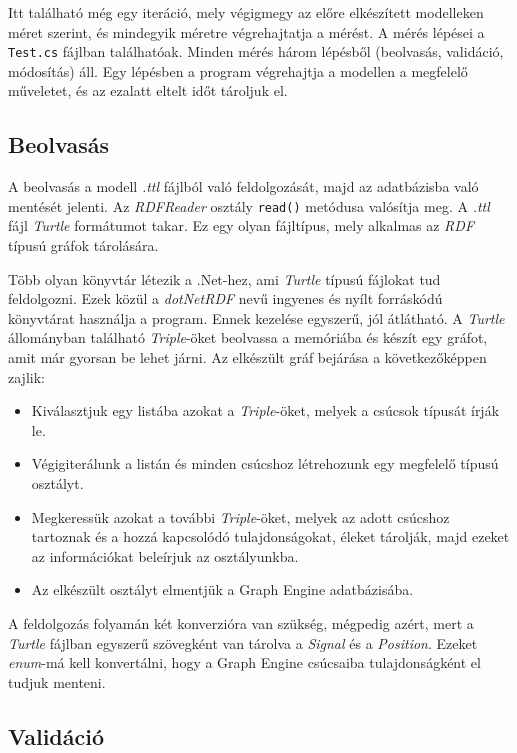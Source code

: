 Itt található még egy iteráció, mely végigmegy az előre elkészített modelleken méret szerint, és mindegyik méretre végrehajtatja a mérést. A mérés lépései a \texttt{Test.cs} fájlban találhatóak. Minden mérés három lépésből (beolvasás, validáció, módosítás) áll. Egy lépésben a program végrehajtja a modellen a megfelelő műveletet, és az ezalatt eltelt időt tároljuk el.

\subsection{Beolvasás}

A beolvasás a modell \emph{.ttl} fájlból való feldolgozását, majd az adatbázisba való mentését jelenti. Az \emph{RDFReader} osztály \texttt{read()} metódusa valósítja meg. A \emph{.ttl} fájl \emph{Turtle} formátumot takar. Ez egy olyan fájltípus, mely alkalmas az \emph{RDF} típusú gráfok tárolására. 

Több olyan könyvtár létezik a .Net-hez, ami \emph{Turtle} típusú fájlokat tud feldolgozni. Ezek közül a \emph{dotNetRDF} nevű ingyenes és nyílt forráskódú könyvtárat használja a program. Ennek kezelése egyszerű, jól átlátható. A \emph{Turtle} állományban található \emph{Triple}-öket beolvassa a memóriába és készít egy gráfot, amit már gyorsan be lehet járni. Az elkészült gráf bejárása a következőképpen zajlik:

\begin{itemize}
	\item Kiválasztjuk egy listába azokat a \emph{Triple}-öket, melyek a csúcsok típusát írják le.
	\item Végigiterálunk a listán és minden csúcshoz létrehozunk egy megfelelő típusú osztályt.
	\item Megkeressük azokat a további \emph{Triple}-öket, melyek az adott csúcshoz tartoznak és a hozzá kapcsolódó tulajdonságokat, éleket tárolják, majd ezeket az információkat beleírjuk az osztályunkba.
	\item Az elkészült osztályt elmentjük a Graph Engine adatbázisába.
\end{itemize}

A feldolgozás folyamán két konverzióra van szükség, mégpedig azért, mert a \emph{Turtle} fájlban egyszerű szövegként van tárolva a \emph{Signal} és a \emph{Position}. Ezeket \emph{enum}-má kell konvertálni, hogy a Graph Engine csúcsaiba tulajdonságként el tudjuk menteni.

\subsection{Validáció}

